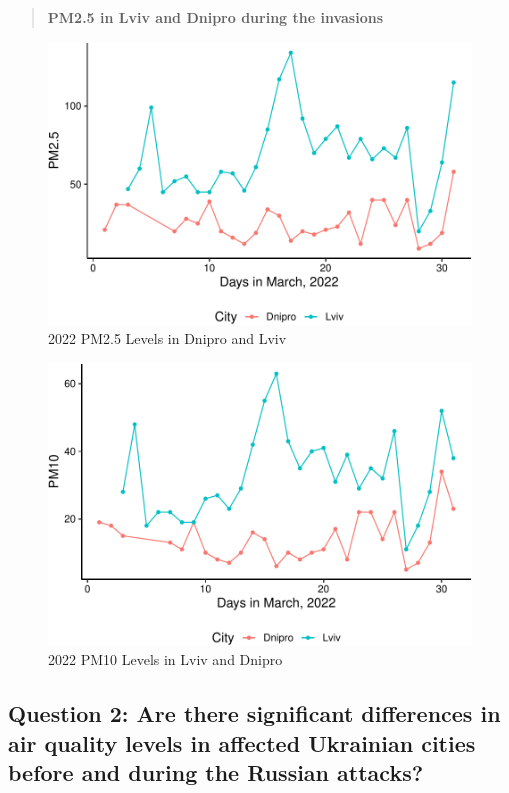 \documentclass[
  12pt,
]{article}
\begin{document}
\begin{quote}
\textbf{PM2.5 in Lviv and Dnipro during the invasions}
\end{quote}

\begin{figure}
\centering
\includegraphics{Fontanie_Gordon_Weinberg_Project_files/figure-latex/Plotting Lviv vs Dnipro PM25-1.pdf}
\caption{2022 PM2.5 Levels in Dnipro and Lviv}
\end{figure}

\begin{figure}
\centering
\includegraphics{Fontanie_Gordon_Weinberg_Project_files/figure-latex/Plotting Lviv and Dnipro PM10-1.pdf}
\caption{2022 PM10 Levels in Lviv and Dnipro}
\end{figure}

\newpage

\hypertarget{question-2-are-there-significant-differences-in-air-quality-levels-in-affected-ukrainian-cities-before-and-during-the-russian-attacks}{%
\subsection{Question 2: Are there significant differences in air quality
levels in affected Ukrainian cities before and during the Russian
attacks?}\label{question-2-are-there-significant-differences-in-air-quality-levels-in-affected-ukrainian-cities-before-and-during-the-russian-attacks}}
\end{document}
